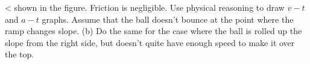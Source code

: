 <%
shown in the figure. Friction is negligible. Use physical
reasoning to draw $v-t$ and $a-t$ graphs. Assume that the
ball doesn't bounce at the point where the ramp changes
slope. (b) Do the same for the case where the ball is rolled
up the slope from the right side, but doesn't quite have
enough speed to make it over the top.
